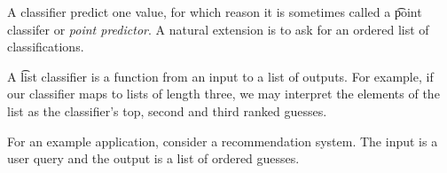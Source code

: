 
A classifier predict one value, for which reason it is sometimes called a \t{point classifer} or \textit{point predictor}.
A natural extension is to ask for an ordered list of classifications.

A \t{list classifier} is a function from an input to a list of outputs.
For example, if our classifier maps to lists of length three, we may interpret the elements of the list as the classifier's top, second and third ranked guesses.

For an example application, consider a recommendation system.
The input is a user query and the output is a list of ordered guesses.


\blankpage
